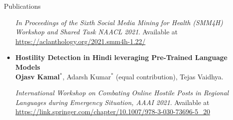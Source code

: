 \documentclass[40]{resume} %
\begin{document}
\begin{rSection}{Publications}
\begin{itemize}[leftmargin=0.15in]
          \emph{In Proceedings of the Sixth Social Media Mining for Health (SMM4H) Workshop and Shared Task NAACL 2021}. Available at \url{https://aclanthology.org/2021.smm4h-1.22/}
          \vspace{4pt}

    \item \textbf{Hostility Detection in Hindi leveraging Pre-Trained Language Models} \\
          \textbf{Ojasv Kamal$^*$}, Adarsh Kumar$^*$ (equal contribution), Tejas Vaidhya.

          \emph{International Workshop on Combating Online Hostile Posts in Regional Languages during Emergency Situation, AAAI 2021}. Available at \url{https://link.springer.com/chapter/10.1007/978-3-030-73696-5_20}
  \end{itemize}
\end{rSection}
\end{document}
